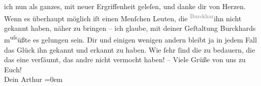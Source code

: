 \begin{ledgroupsized}[t]{13cm}
               ich nun als ganzes, mit neuer Ergriffenheit geleſen, und danke dir von Herzen. Wenn
               es überhaupt möglich iſt \introOben{}einen\introOben{} Menſchen Leuten, die \substVorne{}\textsuperscript{\textcolor{gray}{Burckhar}}{\allowbreak}\substDazwischen{}ihn\substHinten{} nicht gekannt haben, näher zu bringen – ich glaube, mit deiner Geſtaltung
                  Burckhards m\substVorne{}\textsuperscript{uſs}\substDazwischen{}üßte\substHinten{} es gelungen sein. Dir und einigen wenigen andern bleibt ja in jedem Fall das
               Glück ihn gekannt und erkannt zu haben. Wie ſehr ſind die zu bedauern, die das eine
               verſäumt, das andre nicht vermocht haben! –\pend
           \pstart
           Viele Grüße von uns zu Euch!{\\[\baselineskip]}Dein
                  \spacefill\mbox{Arthur}\pend
           \leftskip=0em{}\endnumbering{}\end{ledgroupsized}  \newcommand{\dateiname}{L02152}\newcommand{\titel}{Arthur Schnitzler an Hermann Bahr, 12. 10. 1913}\newcommand{\editorInnen}{ Kurt Ifkovits,  Martin Anton Müller}
            \footnotesize
\begin{ledgroupsized}[t]{11.5cm}
\end{ledgroupsized}
         
      